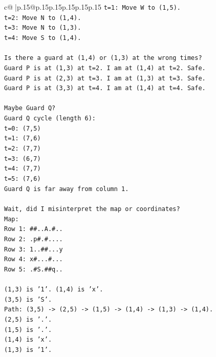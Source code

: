\documentclass{article}
\begin{document}
{\begin{supertabular}{c@{$\;$}|p{.15\linewidth}@{}p{.15\linewidth}p{.15\linewidth}p{.15\linewidth}p{.15\linewidth}p{.15\linewidth}}
{{{\texttt{t=1: Move W to (1,5).} \\
\texttt{t=2: Move N to (1,4).} \\
\texttt{t=3: Move N to (1,3).} \\
\texttt{t=4: Move S to (1,4).} \\
\\ 
\texttt{Is there a guard at (1,4) or (1,3) at the wrong times?} \\
\texttt{Guard P is at (1,3) at t=2. I am at (1,4) at t=2. Safe.} \\
\texttt{Guard P is at (2,3) at t=3. I am at (1,3) at t=3. Safe.} \\
\texttt{Guard P is at (3,3) at t=4. I am at (1,4) at t=4. Safe.} \\
\\ 
\texttt{Maybe Guard Q?} \\
\texttt{Guard Q cycle (length 6):} \\
\texttt{t=0: (7,5)} \\
\texttt{t=1: (7,6)} \\
\texttt{t=2: (7,7)} \\
\texttt{t=3: (6,7)} \\
\texttt{t=4: (7,7)} \\
\texttt{t=5: (7,6)} \\
\texttt{Guard Q is far away from column 1.} \\
\\ 
\texttt{Wait, did I misinterpret the map or coordinates?} \\
\texttt{Map:} \\
\texttt{Row 1: \#\#..A.\#..} \\
\texttt{Row 2: .p\#.\#....} \\
\texttt{Row 3: 1..\#\#...y} \\
\texttt{Row 4: x\#...\#...} \\
\texttt{Row 5: .\#S.\#\#q..} \\
\\ 
\texttt{(1,3) is '1'. (1,4) is 'x'.} \\
\texttt{(3,5) is 'S'.} \\
\texttt{Path: (3,5) {-}> (2,5) {-}> (1,5) {-}> (1,4) {-}> (1,3) {-}> (1,4).} \\
\texttt{(2,5) is '.'.} \\
\texttt{(1,5) is '.'.} \\
\texttt{(1,4) is 'x'.} \\
\texttt{(1,3) is '1'.} \\
\\ 
}}}
\end{supertabular}}
\end{document}
